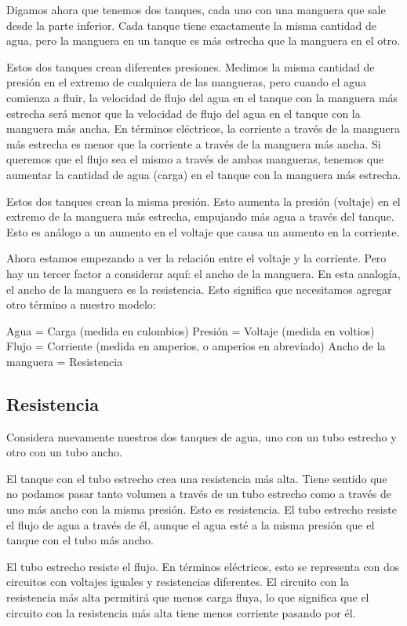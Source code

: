 \documentclass[output=paper, 
colorlinks,
citecolor=brown,
newtxmath
]{langscibook}
\begin{document}
Digamos ahora que tenemos dos tanques, cada uno con una manguera que sale desde la parte inferior. Cada tanque tiene exactamente la misma cantidad de agua, pero la manguera en un tanque es más estrecha que la manguera en el otro.

Estos dos tanques crean diferentes presiones.
Medimos la misma cantidad de presión en el extremo de cualquiera de las mangueras, pero cuando el agua comienza a fluir, la velocidad de flujo del agua en el tanque con la manguera más estrecha será menor que la velocidad de flujo del agua en el tanque con la manguera más ancha. En términos eléctricos, la corriente a través de la manguera más estrecha es menor que la corriente a través de la manguera más ancha. Si queremos que el flujo sea el mismo a través de ambas mangueras, tenemos que aumentar la cantidad de agua (carga) en el tanque con la manguera más estrecha.

Estos dos tanques crean la misma presión.
Esto aumenta la presión (voltaje) en el extremo de la manguera más estrecha, empujando más agua a través del tanque. Esto es análogo a
un aumento en el voltaje que causa un aumento en la corriente.

Ahora estamos empezando a ver la relación entre el voltaje y la corriente. Pero hay un tercer factor a considerar aquí: el ancho de la manguera. En esta analogía, el ancho de la manguera es la resistencia. Esto significa que necesitamos agregar otro término a nuestro modelo:

Agua = Carga (medida en culombios)
Presión = Voltaje (medida en voltios)
Flujo = Corriente (medida en amperios, o amperios en abreviado)
Ancho de la manguera = Resistencia

\subsection{Resistencia}

Considera nuevamente nuestros dos tanques de agua, uno con un tubo estrecho y otro con un tubo ancho.

El tanque con el tubo estrecho crea una resistencia más alta.
Tiene sentido que no podamos pasar tanto volumen a través de un tubo estrecho como a través de uno más ancho con la misma presión. Esto es resistencia. El tubo estrecho resiste el flujo de agua a través de él, aunque el agua esté a la misma presión que el tanque con el tubo más ancho.

El tubo estrecho resiste el flujo.
En términos eléctricos, esto se representa con dos circuitos con voltajes iguales y resistencias diferentes. El circuito con la resistencia más alta permitirá que menos carga fluya, lo que significa que el circuito con la resistencia más alta tiene menos corriente pasando por él.
\end{document}
